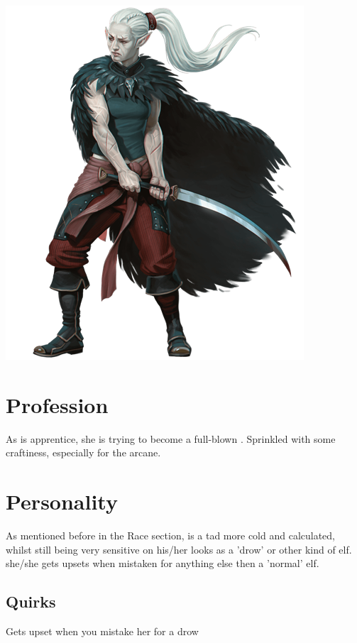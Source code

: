    \vfill
    \includegraphics[width=\linewidth-2ex]{images/shadar-kai.png}
    \vfill
    \newpage
  
    \section{Profession}
    As \Name{} is \Master{} apprentice, she is trying to become a full-blown \Class{}. Sprinkled with some craftiness, especially for the arcane.

    \section{Personality}
    As mentioned before in the Race section, \Name{} is a tad more cold and calculated, whilst still being very sensitive on his/her looks as a 'drow' or other kind of elf. she/she gets upsets when mistaken for anything else then a 'normal' elf.

    \subsection{Quirks}
    Gets upset when you mistake her for a drow

